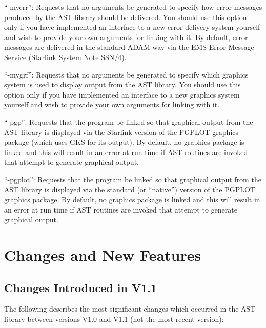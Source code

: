 \documentclass[twoside,11pt]{article}
\newcommand{\htmlref}[2]{#1}
\newcommand{\xlabel}[1]{}
\begin{document}
{{{         \sstitem
         ``-myerr'': Requests that no arguments be generated to specify how
         error messages produced by the AST library should be delivered. You
         should use this option only if you have implemented an interface to a
         new error delivery system yourself and wish to provide your own
         arguments for linking with it. By default, error messages are delivered
         in the standard ADAM way via the EMS Error Message Service (Starlink
         \htmlref{System}{System} Note SSN/4).

         \sstitem
         ``-mygrf'': Requests that no arguments be generated to specify which
         graphics system is used to display output from the AST library. You
         should use this option only if you have implemented an interface to a
         new graphics system yourself and wish to provide your own arguments for
         linking with it.

         \sstitem
         ``-pgp'': Requests that the program be linked so that
         graphical output from the AST library is displayed via the
         Starlink version of the PGPLOT graphics package (which uses GKS
         for its output). By default, no graphics package is linked and
         this will result in an error at run time if AST routines are
         invoked that attempt to generate graphical output.

         \sstitem
         ``-pgplot'': Requests that the program be linked so that
         graphical output from the AST library is displayed via the
         standard (or ``native'') version of the PGPLOT graphics
         package. By default, no graphics package is linked and this will
         result in an error at run time if AST routines are invoked that
         attempt to generate graphical output.
      }
   }
}
\normalsize

\newpage
\section{\xlabel{changes_and_new_features}\label{ss:changes}Changes and New Features}

\subsection{Changes Introduced in V1.1}

The following describes the most significant changes which occurred in
the AST library between versions V1.0 and V1.1 (not the most recent
version):
\end{document}
